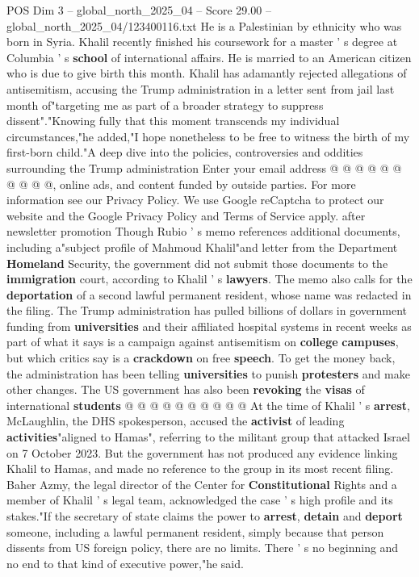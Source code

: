 \begin{textsample}{POS Dim 3 – global\_north\_2025\_04 – Score 29.00 – global\_north\_2025\_04/123400116.txt}
He is a Palestinian by ethnicity who was born in Syria.
Khalil recently finished his coursework for a master ' s degree at Columbia ' s \textbf{school} of international affairs.
He is married to an American citizen who is due to give birth this month.
Khalil has adamantly rejected allegations of antisemitism, accusing the Trump administration in a letter sent from jail last month of"targeting me as part of a broader strategy to suppress dissent"."Knowing fully that this moment transcends my individual circumstances,"he added,"I hope nonetheless to be free to witness the birth of my first-born child."A deep dive into the policies, controversies and oddities surrounding the Trump administration Enter your email address @ @ @ @ @ @ @ @ @ @, online ads, and content funded by outside parties.
For more information see our Privacy Policy.
We use Google reCaptcha to protect our website and the Google Privacy Policy and Terms of Service apply. after newsletter promotion Though Rubio ' s memo references additional documents, including a"subject profile of Mahmoud Khalil"and letter from the Department \textbf{Homeland} Security, the government did not submit those documents to the \textbf{immigration} court, according to Khalil ' s \textbf{lawyers}.
The memo also calls for the \textbf{deportation} of a second lawful permanent resident, whose name was redacted in the filing.
The Trump administration has pulled billions of dollars in government funding from \textbf{universities} and their affiliated hospital systems in recent weeks as part of what it says is a campaign against antisemitism on \textbf{college} \textbf{campuses}, but which critics say is a \textbf{crackdown} on free \textbf{speech}.
To get the money back, the administration has been telling \textbf{universities} to punish \textbf{protesters} and make other changes.
The US government has also been \textbf{revoking} the \textbf{visas} of international \textbf{students} @ @ @ @ @ @ @ @ @ @ At the time of Khalil ' s \textbf{arrest}, McLaughlin, the DHS spokesperson, accused the \textbf{activist} of leading \textbf{activities}"aligned to Hamas", referring to the militant group that attacked Israel on 7 October 2023.
But the government has not produced any evidence linking Khalil to Hamas, and made no reference to the group in its most recent filing.
Baher Azmy, the legal director of the Center for \textbf{Constitutional} Rights and a member of Khalil ' s legal team, acknowledged the case ' s high profile and its stakes."If the secretary of state claims the power to \textbf{arrest}, \textbf{detain} and \textbf{deport} someone, including a lawful permanent resident, simply because that person dissents from US foreign policy, there are no limits.
There ' s no beginning and no end to that kind of executive power,"he said.

\end{textsample}
